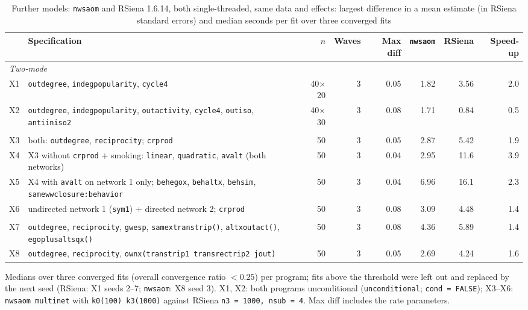 \begin{table}[htbp]
\centering
\caption{Further models: \texttt{nwsaom} and RSiena 1.6.14, both single-threaded, same data and effects:
largest difference in a mean estimate (in RSiena standard errors) and median seconds per fit over three converged fits}
\label{tab:benchextra}
\footnotesize
\begin{tabular}{l>{\raggedright\arraybackslash}p{}rrrrrr}
\toprule
 & Specification & $n$ & Waves & Max diff & \texttt{nwsaom} & RSiena & Speed-up \\
\midrule
\multicolumn{8}{l}{\textit{Two-mode}} \\
X1 & \texttt{outdegree}, \texttt{indegpopularity}, \texttt{cycle4} & 40$\times$20 & 3 & 0.05 & 1.82 & 3.56 & 2.0 \\
X2 & \texttt{outdegree}, \texttt{indegpopularity}, \texttt{outactivity}, \texttt{cycle4}, \texttt{outiso}, \texttt{antiiniso2} & 40$\times$30 & 3 & 0.08 & 1.71 & 0.84 & 0.5 \\
\addlinespace
\multicolumn{8}{l}{\textit{Two networks}} \\
X3 & both: \texttt{outdegree}, \texttt{reciprocity}; \texttt{crprod} & 50 & 3 & 0.05 & 2.87 & 5.42 & 1.9 \\
X4 & X3 without \texttt{crprod} + smoking: \texttt{linear}, \texttt{quadratic}, \texttt{avalt} (both networks) & 50 & 3 & 0.04 & 2.95 & 11.6 & 3.9 \\
X5 & X4 with \texttt{avalt} on network 1 only; \texttt{behegox}, \texttt{behaltx}, \texttt{behsim}, \texttt{samewwclosure:behavior} & 50 & 3 & 0.04 & 6.96 & 16.1 & 2.3 \\
X6 & undirected network 1 (\texttt{sym1}) + directed network 2; \texttt{crprod} & 50 & 3 & 0.08 & 3.09 & 4.48 & 1.4 \\
\addlinespace
\multicolumn{8}{l}{\textit{Single network}} \\
X7 & \texttt{outdegree}, \texttt{reciprocity}, \texttt{gwesp}, \texttt{samextranstrip()}, \texttt{altxoutact()}, \texttt{egoplusaltsqx()} & 50 & 3 & 0.08 & 4.36 & 5.89 & 1.4 \\
X8 & \texttt{outdegree}, \texttt{reciprocity}, \texttt{ownx(transtrip1 transrectrip2 jout)} & 50 & 3 & 0.05 & 2.69 & 4.24 & 1.6 \\
\bottomrule
\end{tabular}
\par\smallskip\footnotesize Medians over three converged fits (overall convergence ratio $<0.25$) per program; fits above the threshold were left out and replaced by the next seed (RSiena: X1 seeds 2--7; \texttt{nwsaom}: X8 seed 3). X1, X2: both programs unconditional (\texttt{unconditional}; \texttt{cond = FALSE}); X3--X6: \texttt{nwsaom multinet} with \texttt{k0(100) k3(1000)} against RSiena \texttt{n3 = 1000, nsub = 4}. Max diff includes the rate parameters.
\end{table}

